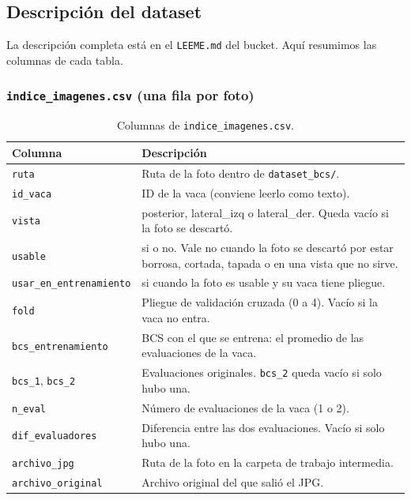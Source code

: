 \subsection{Descripción del dataset}\label{sec:descripcion}

La descripción completa está en el \nolinkurl{LEEME.md} del bucket. Aquí resumimos las columnas de cada tabla.

\subsubsection*{\texttt{indice\_imagenes.csv} (una fila por foto)}

\begin{table}[H]
  \centering
  \small
  \caption{Columnas de \texttt{indice\_imagenes.csv}.}
  \label{tab:col-indice}
  \begin{tabularx}{\textwidth}{>{\raggedright\arraybackslash}p{}>{\raggedright\arraybackslash}X}
    \toprule
    Columna & Descripción \\
    \midrule
    \texttt{ruta} & Ruta de la foto dentro de \nolinkurl{dataset_bcs/}. \\
    \texttt{id\_vaca} & ID de la vaca (conviene leerlo como texto). \\
    \texttt{vista} & posterior, lateral\_izq o lateral\_der. Queda vacío si la foto se descartó. \\
    \texttt{usable} & si o no. Vale no cuando la foto se descartó por estar borrosa, cortada, tapada o en una vista que no sirve. \\
    \texttt{usar\_en\_entrenamiento} & si cuando la foto es usable y su vaca tiene pliegue. \\
    \texttt{fold} & Pliegue de validación cruzada (0 a 4). Vacío si la vaca no entra. \\
    \texttt{bcs\_entrenamiento} & BCS con el que se entrena: el promedio de las evaluaciones de la vaca. \\
    \texttt{bcs\_1}, \texttt{bcs\_2} & Evaluaciones originales. \texttt{bcs\_2} queda vacío si solo hubo una. \\
    \texttt{n\_eval} & Número de evaluaciones de la vaca (1 o 2). \\
    \texttt{dif\_evaluadores} & Diferencia entre las dos evaluaciones. Vacío si solo hubo una. \\
    \texttt{archivo\_jpg} & Ruta de la foto en la carpeta de trabajo intermedia. \\
    \texttt{archivo\_original} & Archivo original del que salió el JPG. \\

\end{tabularx}
\end{table}
